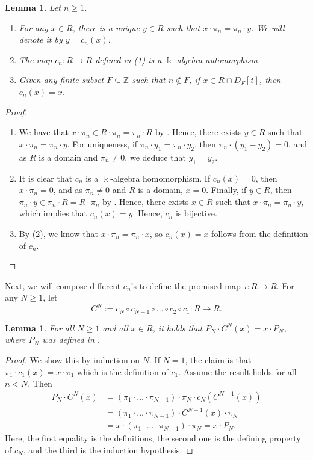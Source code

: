 \documentclass{amsart}
\newtheorem{lem}[equation]{Lemma}
\theoremstyle{definition}
\renewcommand{\k}{\Bbbk}
\numberwithin{equation}{section}
\begin{document}
\begin{lem}\label{lem:local-triv}
Let $ n \ge 1$.
\begin{enumerate}
\item For any $x \in R$, there is a unique $y \in R$ such that $x\cdot \pi_n = \pi_n \cdot y$. We will denote it by $y = c_n(x)$.
\item The map $c_n:R \to R$ defined in (1) is a $\k$-algebra automorphism.
\item Given any finite subset $F \subseteq \mathbb{Z}$ such that $n \notin F$,
if $x \in R \cap D_F[t]$, then $c_n(x) = x$.
\end{enumerate}
\end{lem}
\begin{proof}\quad
\begin{enumerate}
\item We have that $x \cdot \pi_n \in R\cdot \pi_n = \pi_n \cdot R$ by .
Hence, there exists $y \in R$ such that $x\cdot \pi_n = \pi_n \cdot y$.
For uniqueness, if $\pi_n \cdot y_1 = \pi_n \cdot y_2$,
then $\pi_n\cdot (y_1 - y_2)=0$, and as $R$ is a domain and $\pi_n \ne 0$, we deduce that $y_1 = y_2$.
\item It is clear that $c_n$ is a $\k$-algebra homomorphism.
If $c_n(x) =0$, then $x\cdot \pi_n = 0$, and as $\pi_n \ne 0$ and $R$ is a domain, $x = 0$.
Finally, if $y \in R$, then $\pi_n \cdot y \in \pi_n \cdot R = R\cdot \pi_n$ by .
Hence, there exists $x \in R$ such that $x\cdot \pi_n = \pi_n\cdot y$,
which implies that $c_n(x) =y$. Hence, $c_n$ is bijective.
\item By (2), we know that $x\cdot \pi_n = \pi_n \cdot x$, so $c_n(x) = x$ follows from the definition of $c_n$.
\end{enumerate}
\end{proof}

Next, we will compose different $c_n$'s to define the promised map $\tau:R \to R$. 
For any $N \ge 1$,
let 
\[
C^N := c_N\circ c_{N-1} \circ \dots \circ c_2 \circ c_1 :R \to R.
\]

\begin{lem}\label{lem:CNPN}
For all $N \ge 1$ and all $x \in R$,
it holds that $P_N \cdot C^N(x) = x\cdot P_N$,
where $P_N$ was defined in .
\end{lem}
\begin{proof}
We show this by induction on $N$.
If $N=1$, the claim is that $\pi_1 \cdot c_1(x) = x\cdot \pi_1$ which is the definition of $c_1$.
Assume the result holds for all $n < N$.
Then
\begin{align*}
P_N \cdot C^N(x) &= (\pi_1\cdot \dots \cdot \pi_{N-1}) \cdot \pi_N \cdot c_N(C^{N-1}(x)) \\ &= (\pi_1\cdot \dots \cdot \pi_{N-1}) \cdot C^{N-1}(x) \cdot \pi_N \\ 
&= x \cdot (\pi_1\cdot \dots \cdot \pi_{N-1}) \cdot \pi_N = x\cdot P_N.
\end{align*}
Here, the first equality is the definitions,
the second one is the defining property of $c_N$,
and the third is the induction hypothesis.
\end{proof}
\end{document}
